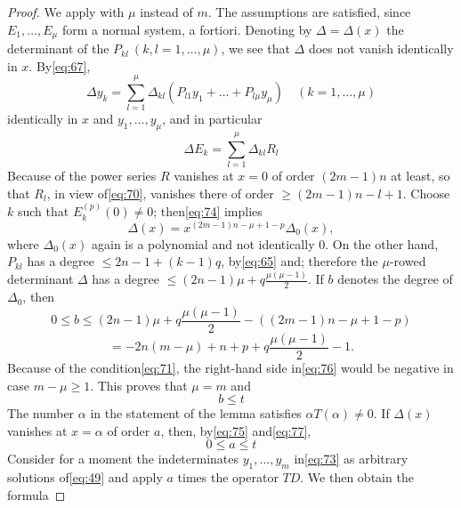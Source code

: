 \begin{proof}
We apply with $\mu$ instead of $m$. The assumptions are satisfied, since $E_1, \dots, E_\mu$ form a normal system, a fortiori. Denoting by $\Delta = \Delta(x)$ the determinant of the $P_{kl} \ (k, l = 1, \dots, \mu)$, we see that $\Delta$ does not vanish identically in $x$. By\eqref{eq:67},
\begin{equation}
\Delta y_k = \sum_{l=1}^{\mu} \Delta_{kl} (P_{l1}y_1 + \dots + P_{l\mu} y_{\mu}) \quad (k=1,\dots,\mu) \tag{73}\label{eq:73}
\end{equation}
identically in $x$ and $y_1, \dots, y_\mu$, and in particular
\begin{equation}
\Delta E_{k} = \sum_{l=1}^{\mu} \Delta_{kl} R_{l} \tag{74}\label{eq:74}
\end{equation}
Because of the power series $R$ vanishes at $x=0$ of order $(2m-1)n$ at least, so that $R_l$, in view of\eqref{eq:70}, vanishes there of order $\ge (2m-1)n - l + 1$. Choose $k$ such that $E_k^{(p)}(0) \neq 0$; then\eqref{eq:74} implies
\begin{equation}
\Delta(x) = x^{(2m-1)n - \mu + 1 - p} \Delta_0(x), \tag{75}\label{eq:75}
\end{equation}
where $\Delta_0(x)$ again is a polynomial and not identically 0. On the other hand, $P_{kl}$ has a degree $\le 2n - 1 + (k-1)q$, by\eqref{eq:65} and; therefore the $\mu$-rowed determinant $\Delta$ has a degree $\le (2n-1)\mu + q \frac{\mu(\mu-1)}{2}$. If $b$ denotes the degree of $\Delta_0$, then
\begin{equation}
0 \le b \le (2n-1)\mu + q\frac{\mu(\mu-1)}{2} - \left((2m-1)n - \mu + 1 - p\right) \tag{76}\label{eq:76}
\end{equation}
\[= -2n(m-\mu) + n + p + q\frac{\mu(\mu-1)}{2} - 1.\]
Because of the condition\eqref{eq:71}, the right-hand side in\eqref{eq:76} would be negative in case $m - \mu \ge 1$. This proves that $\mu = m$ and
\begin{equation}
b \le t \tag{77}\label{eq:77}
\end{equation}
The number $\alpha$ in the statement of the lemma satisfies $\alpha T(\alpha) \neq 0$. If $\Delta(x)$ vanishes at $x=\alpha$ of order $a$, then, by\eqref{eq:75} and\eqref{eq:77},
\begin{equation}
0 \le a \le t \tag{78}\label{eq:78}
\end{equation}
Consider for a moment the indeterminates $y_1, \dots, y_m$ in\eqref{eq:73} as arbitrary solutions of\eqref{eq:49} and apply $a$ times the operator $TD$. We then obtain the formula

\end{proof}
